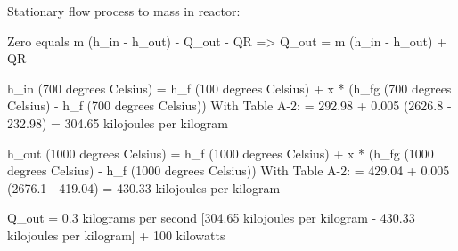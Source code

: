 Stationary flow process to mass in reactor:

Zero equals m (h_in - h_out) - Q_out - QR  
=> Q_out = m (h_in - h_out) + QR  

h_in (700 degrees Celsius)  
= h_f (100 degrees Celsius) + x * (h_fg (700 degrees Celsius) - h_f (700 degrees Celsius))  
With Table A-2:  
= 292.98 + 0.005 (2626.8 - 232.98)  
= 304.65 kilojoules per kilogram  

h_out (1000 degrees Celsius)  
= h_f (1000 degrees Celsius) + x * (h_fg (1000 degrees Celsius) - h_f (1000 degrees Celsius))  
With Table A-2:  
= 429.04 + 0.005 (2676.1 - 419.04)  
= 430.33 kilojoules per kilogram  

Q_out = 0.3 kilograms per second [304.65 kilojoules per kilogram - 430.33 kilojoules per kilogram] + 100 kilowatts